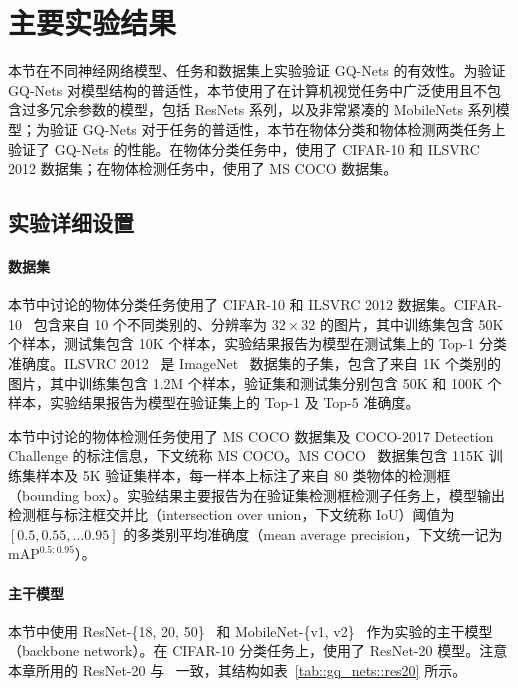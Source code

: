 \section{主要实验结果} \label{sec::gq_nets::exp}
本节在不同神经网络模型、任务和数据集上实验验证 GQ-Nets 的有效性。为验证 GQ-Nets 对模型结构的普适性，本节使用了在计算机视觉任务中广泛使用且不包含过多冗余参数的模型，包括 ResNets 系列，以及非常紧凑的 MobileNets 系列模型；为验证 GQ-Nets 对于任务的普适性，本节在物体分类和物体检测两类任务上验证了 GQ-Nets 的性能。在物体分类任务中，使用了 CIFAR-10 和 ILSVRC 2012 数据集；在物体检测任务中，使用了 MS COCO 数据集。
\subsection{实验详细设置} \label{sec::gq_nets::general_conf}
\paragraph{数据集}
本节中讨论的物体分类任务使用了 CIFAR-10 和 ILSVRC 2012 数据集。CIFAR-10~\citep{krizhevsky2009learning} 包含来自 10 个不同类别的、分辨率为 $32 \times 32$ 的图片，其中训练集包含 50K 个样本，测试集包含 10K 个样本，实验结果报告为模型在测试集上的 Top-1 分类准确度。ILSVRC 2012~\citep{ILSVRC15} 是 ImageNet~\citep{deng2009imagenet} 数据集的子集，包含了来自 1K 个类别的图片，其中训练集包含 1.2M 个样本，验证集和测试集分别包含 50K 和 100K 个样本，实验结果报告为模型在验证集上的 Top-1 及 Top-5 准确度。

本节中讨论的物体检测任务使用了 MS COCO 数据集及 COCO-2017 Detection Challenge 的标注信息，下文统称 MS COCO。MS COCO~\citep{lin2014microsoft} 数据集包含 115K 训练集样本及 5K 验证集样本，每一样本上标注了来自 80 类物体的检测框（bounding box）。实验结果主要报告为在验证集检测框检测子任务上，模型输出检测框与标注框交并比（intersection over union，下文统称 IoU）阈值为 $[0.5, 0.55, \ldots 0.95]$ 的多类别平均准确度（mean average precision，下文统一记为 $\mathrm{mAP}^{0.5:0.95}$）。

\paragraph{主干模型} 本节中使用 ResNet-\{18, 20, 50\}~\citep{He_2016} 和 MobileNet-\{v1, v2\}~\citep{howard2017mobilenets, Sandler_2018} 作为实验的主干模型（backbone network）。在 CIFAR-10 分类任务上，使用了 ResNet-20 模型。注意本章所用的 ResNet-20 与~\citet{zhou2016dorefanet, choi2018pact, jung2019learning, li2019additive} 一致，其结构如表~\ref{tab::gq_nets::res20} 所示。

